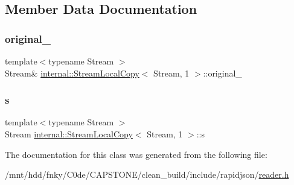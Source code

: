 \subsection{Member Data Documentation}
\mbox{\label{classinternal_1_1StreamLocalCopy_3_01Stream_00_011_01_4_a95cf773c6d96bb2c862cec8d1b54d658}} 
\subsubsection{\texorpdfstring{original\+\_\+}{original\_}}
{\footnotesize\ttfamily template$<$typename Stream $>$ \\
Stream\& \hyperlink{classinternal_1_1StreamLocalCopy}{internal\+::\+Stream\+Local\+Copy}$<$ Stream, 1 $>$\+::original\+\_\+\hspace{0.3cm}{\ttfamily [private]}}

\mbox{\label{classinternal_1_1StreamLocalCopy_3_01Stream_00_011_01_4_a1d3e8ae8756325df25715d4ffb9c1b44}} 
\subsubsection{\texorpdfstring{s}{s}}
{\footnotesize\ttfamily template$<$typename Stream $>$ \\
Stream \hyperlink{classinternal_1_1StreamLocalCopy}{internal\+::\+Stream\+Local\+Copy}$<$ Stream, 1 $>$\+::s}



The documentation for this class was generated from the following file\+:\begin{DoxyCompactItemize}
\item 
/mnt/hdd/fnky/\+C0de/\+C\+A\+P\+S\+T\+O\+N\+E/clean\+\_\+build/include/rapidjson/\hyperlink{reader_8h}{reader.\+h}\end{DoxyCompactItemize}
